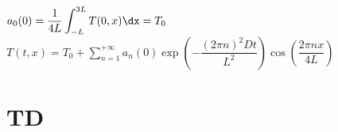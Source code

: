 \documentclass[12pt,a4paper]{article}
\begin{document}
$a_0(0) = \dfrac1{4L}\displaystyle\int_{-L}^{3L} T(0,x)\dx = T_0$ \hspace{2cm} $T(t,x) = T_0 + \displaystyle\sum_{n=1}^{+\infty} a_n(0)\exp\left(-\dfrac{(2\pi n)^2Dt}{L^2}\right)\cos\left(\dfrac{2\pi nx}{4L}\right)$



	
	
	
	
	
	
	
	
	
	
	
	
	
	
	
	
	
	
	
	
	
	
	
	
	
	
	
	
	
	
	
	
	
	
	
	
	
	
	
	
	
	
	
	
	
	
	
	
	
	
	
	
	
	
	
	
	
	
	
	
	
	
	
	
	
	
	
	
	
	
	
	
	
	
	
	
	
	
	
	
	
	
	
	
	
	
	
	
	
	
	
	
	
	
	
	\newpage
	
	\section{TD}
\end{document}
